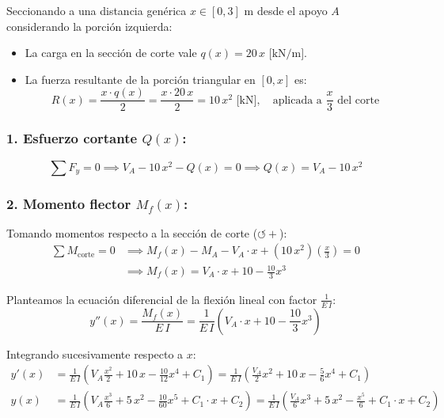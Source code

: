 
Seccionando a una distancia genérica $x \in [0, 3]\text{ m}$ desde el apoyo $A$ considerando la porción izquierda:
\begin{itemize}
    \item La carga en la sección de corte vale $q(x) = 20\,x\text{ [kN/m]}$.
    \item La fuerza resultante de la porción triangular en $[0, x]$ es:
          \begin{equation}
              R(x) = \frac{x \cdot q(x)}{2} = \frac{x \cdot 20\,x}{2} = 10\,x^2\text{ [kN]}, \quad \text{aplicada a } \frac{x}{3}\text{ del corte}
          \end{equation}
\end{itemize}

\subsubsection*{1. Esfuerzo cortante $Q(x)$:}
\begin{equation}
    \sum F_y = 0 \implies V_A - 10\,x^2 - Q(x) = 0 \implies \boxed{Q(x) = V_A - 10\,x^2}
\end{equation}

\subsubsection*{2. Momento flector $M_f(x)$:}
Tomando momentos respecto a la sección de corte ($\circlearrowleft +$):
\begin{align}
    \sum M_{\text{corte}} = 0 & \implies M_f(x) - M_A - V_A \cdot x + (10\,x^2)\left(\frac{x}{3}\right) = 0 \nonumber \\
                              & \implies \boxed{M_f(x) = V_A \cdot x + 10 - \frac{10}{3}x^3}
\end{align}


Planteamos la ecuación diferencial de la flexión lineal con factor $\frac{1}{E\,I}$:
\begin{equation}
    y''(x) = \frac{M_f(x)}{E\,I} = \frac{1}{E\,I}\left( V_A \cdot x + 10 - \frac{10}{3}x^3 \right)
\end{equation}

Integrando sucesivamente respecto a $x$:
\begin{align}
    y'(x) & = \frac{1}{E\,I}\left( V_A \frac{x^2}{2} + 10\,x - \frac{10}{12}x^4 + C_1 \right) = \frac{1}{E\,I}\left( \frac{V_A}{2}x^2 + 10\,x - \frac{5}{6}x^4 + C_1 \right) \\[6pt]
    y(x)  & = \frac{1}{E\,I}\left( V_A \frac{x^3}{6} + 5\,x^2 - \frac{10}{60}x^5 + C_1 \cdot x + C_2 \right) = \frac{1}{E\,I}\left( \frac{V_A}{6}x^3 + 5\,x^2 - \frac{x^5}{6} + C_1 \cdot x + C_2 \right)
\end{align}

